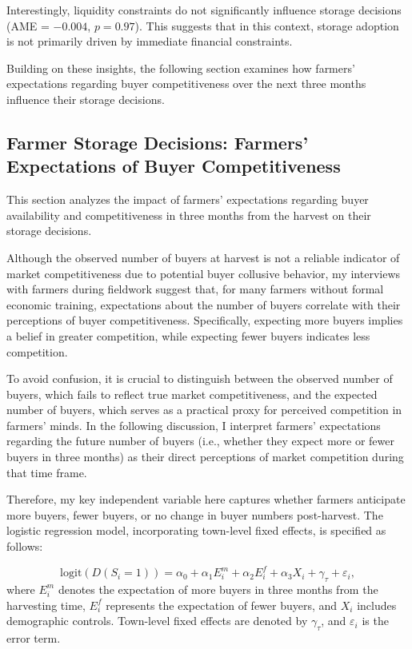Interestingly, liquidity constraints do not significantly influence storage decisions (AME = $-0.004$, $p=0.97$). This suggests that in this context, storage adoption is not primarily driven by immediate financial constraints.

Building on these insights, the following section examines how farmers' expectations regarding buyer competitiveness over the next three months influence their storage decisions.




\subsection{Farmer Storage Decisions: Farmers' Expectations of Buyer Competitiveness}

\noindent This section analyzes the impact of farmers' expectations regarding buyer availability and competitiveness in three months from the harvest on their storage decisions. 

Although the observed number of buyers at harvest is not a reliable indicator of market competitiveness due to potential buyer collusive behavior, my interviews with farmers during fieldwork suggest that, for many farmers without formal economic training, expectations about the number of buyers correlate with their perceptions of buyer competitiveness. Specifically, expecting more buyers implies a belief in greater competition, while expecting fewer buyers indicates less competition.

To avoid confusion, it is crucial to distinguish between the observed number of buyers, which fails to reflect true market competitiveness, and the expected number of buyers, which serves as a practical proxy for perceived competition in farmers' minds. In the following discussion, I interpret farmers' expectations regarding the future number of buyers (i.e., whether they expect more or fewer buyers in three months) as their direct perceptions of market competition during that time frame.





Therefore, my key independent variable here captures whether farmers anticipate more buyers, fewer buyers, or no change in buyer numbers post-harvest. The logistic regression model, incorporating town-level fixed effects, is specified as follows:

\begin{equation}
    \text{logit} \left( D(S_i = 1) \right) = \alpha_0 + \alpha_1 E^m_i + \alpha_2 E^f_i + \alpha_3 X_i + \gamma_\tau + \varepsilon_i,
\end{equation}
where $E^m_i$ denotes the expectation of more buyers in three months from the harvesting time, $E^f_i$ represents the expectation of fewer buyers, and $X_i$ includes demographic controls. Town-level fixed effects are denoted by $\gamma_\tau$, and $\varepsilon_i$ is the error term.

